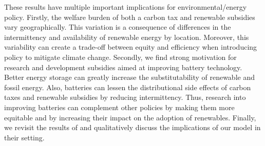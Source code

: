 \documentclass[11pt,a4paper,leqno]{extarticle}
\begin{document}
	These results have multiple important implications for environmental/energy policy. Firstly, the welfare burden of both a carbon tax and renewable subsidies vary geographically. This variation is a consequence of differences in the intermittency and availability of renewable energy by location. Moreover, this variability can create a trade-off between equity and efficiency when introducing policy to mitigate climate change. Secondly, we find strong motivation for research and development subsidies aimed at improving battery technology. Better energy storage can greatly increase the substitutability of renewable and fossil energy.  Also, batteries can  lessen the distributional side effects of carbon taxes and renewable subsidies by  reducing intermittency. Thus, research into improving batteries can complement other policies by making them more equitable and by increasing their impact on the adoption of renewables. Finally, we revisit the results of \citet{Ace2012} and qualitatively discuss the implications of our model in their setting.
	
\end{document}
